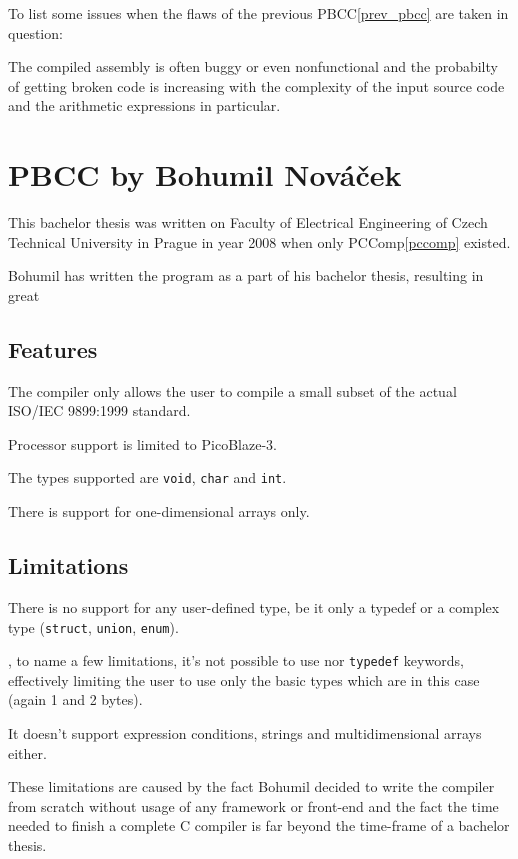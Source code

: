         To list some issues when the flaws of the previous PBCC\ref{prev_pbcc} are taken in question:

        The compiled assembly is often buggy or even nonfunctional and the probabilty of getting broken code is increasing with the complexity of the input source code and the arithmetic expressions in particular.

    \section{PBCC by Bohumil Nováček}\label{not_quite_c}

    This bachelor thesis was written on Faculty of Electrical Engineering of Czech Technical University in Prague in year 2008 when only PCComp\ref{pccomp} existed.

    Bohumil has written the program as a part of his bachelor thesis, resulting in great %

        \subsection{Features}

        The compiler only allows the user to compile a small subset of the actual ISO/IEC 9899:1999 standard.

        Processor support is limited to PicoBlaze-3.

        The types supported are \texttt{void}, \texttt{char} and \texttt{int}.

        There is support for one-dimensional arrays only.

        \subsection{Limitations}

        There is no support for any user-defined type, be it only a typedef or a complex type (\texttt{struct}, \texttt{union}, \texttt{enum}).

    ,
    to name a few limitations, it's not possible to use
    nor \texttt{typedef} keywords,
    effectively limiting the user to use only the basic types which are in this case  (again 1 and 2 bytes).

    It doesn't support expression conditions, strings and multidimensional arrays either.

    These limitations are caused by the fact Bohumil decided to write the compiler
    from scratch without usage of any framework or front-end and the fact the time needed to finish a complete C compiler is far beyond the time-frame of a bachelor thesis.

